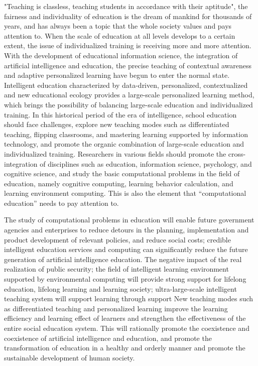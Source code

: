 \documentclass[11pt,en,authoryear]{elegantpaper}
\begin{document}
"Teaching is classless, teaching students in accordance with their aptitude", the fairness and individuality of education is the dream of mankind for thousands of years, and has always been a topic that the whole society values ​​and pays attention to. When the scale of education at all levels develops to a certain extent, the issue of individualized training is receiving more and more attention. With the development of educational information science, the integration of artificial intelligence and education, the precise teaching of contextual awareness and adaptive personalized learning have begun to enter the normal state. Intelligent education characterized by data-driven, personalized, contextualized and new educational ecology provides a large-scale personalized learning method, which brings the possibility of balancing large-scale education and individualized training. In this historical period of the era of intelligence, school education should face challenges, explore new teaching modes such as differentiated teaching, flipping classrooms, and mastering learning supported by information technology, and promote the organic combination of large-scale education and individualized training. Researchers in various fields should promote the cross-integration of disciplines such as education, information science, psychology, and cognitive science, and study the basic computational problems in the field of education, namely cognitive computing, learning behavior calculation, and learning environment computing. This is also the element that “computational education” needs to pay attention to.


The study of computational problems in education will enable future government agencies and enterprises to reduce detours in the planning, implementation and product development of relevant policies, and reduce social costs; credible intelligent education services and computing can significantly reduce the future generation of artificial intelligence education. The negative impact of the real realization of public security; the field of intelligent learning environment supported by environmental computing will provide strong support for lifelong education, lifelong learning and learning society; ultra-large-scale intelligent teaching system will support learning through support New teaching modes such as differentiated teaching and personalized learning improve the learning efficiency and learning effect of learners and strengthen the effectiveness of the entire social education system. This will rationally promote the coexistence and coexistence of artificial intelligence and education, and promote the transformation of education in a healthy and orderly manner and promote the sustainable development of human society.
\end{document}
